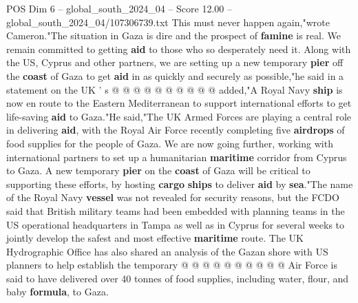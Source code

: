 \begin{textsample}{POS Dim 6 – global\_south\_2024\_04 – Score 12.00 – global\_south\_2024\_04/107306739.txt}
This must never happen again,"wrote Cameron."The situation in Gaza is dire and the prospect of \textbf{famine} is real.
We remain committed to getting \textbf{aid} to those who so desperately need it.
Along with the US, Cyprus and other partners, we are setting up a new temporary \textbf{pier} off the \textbf{coast} of Gaza to get \textbf{aid} in as quickly and securely as possible,"he said in a statement on the UK ' s @ @ @ @ @ @ @ @ @ @ added,"A Royal Navy \textbf{ship} is now en route to the Eastern Mediterranean to support international efforts to get life-saving \textbf{aid} to Gaza."He said,"The UK Armed Forces are playing a central role in delivering \textbf{aid}, with the Royal Air Force recently completing five \textbf{airdrops} of food supplies for the people of Gaza.
We are now going further, working with international partners to set up a humanitarian \textbf{maritime} corridor from Cyprus to Gaza.
A new temporary \textbf{pier} on the \textbf{coast} of Gaza will be critical to supporting these efforts, by hosting \textbf{cargo} \textbf{ships} to deliver \textbf{aid} by \textbf{sea}."The name of the Royal Navy \textbf{vessel} was not revealed for security reasons, but the FCDO said that British military teams had been embedded with planning teams in the US operational headquarters in Tampa as well as in Cyprus for several weeks to jointly develop the safest and most effective \textbf{maritime} route.
The UK Hydrographic Office has also shared an analysis of the Gazan shore with US planners to help establish the temporary @ @ @ @ @ @ @ @ @ @ Air Force is said to have delivered over 40 tonnes of food supplies, including water, flour, and baby \textbf{formula}, to Gaza.

\end{textsample}
